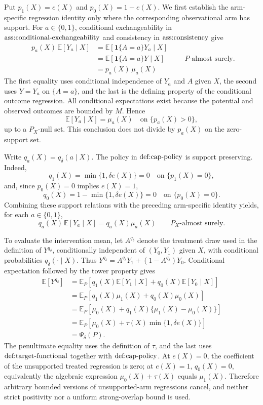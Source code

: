 Put \(p_1(X)=e(X)\) and \(p_0(X)=1-e(X)\).  We first establish the arm-specific regression identity only where the corresponding observational arm has support.  For \(a\in\{0,1\}\), conditional exchangeability in \(\textnormal{ass:conditional-exchangeability}\) and consistency in \(\textnormal{ass:consistency}\) give
\[
\begin{aligned}
 p_a(X)\,\mathbb E[Y_a\mid X]
 &=\mathbb E[\mathbf 1\{A=a\}Y_a\mid X] \\
 &=\mathbb E[\mathbf 1\{A=a\}Y\mid X] \\
 &=p_a(X)\,\mu_a(X)
\end{aligned}
\qquad P\text{-almost surely}.
\]
The first equality uses conditional independence of \(Y_a\) and \(A\) given \(X\), the second uses \(Y=Y_a\) on \(\{A=a\}\), and the last is the defining property of the conditional outcome regression.  All conditional expectations exist because the potential and observed outcomes are bounded by \(M\).  Hence
\[
\mathbb E[Y_a\mid X]=\mu_a(X)
\quad\text{on }\{p_a(X)>0\},
\]
up to a \(P_X\)-null set.  This conclusion does not divide by \(p_a(X)\) on the zero-support set.

Write \(q_a(X)=q_\delta(a\mid X)\).  The policy in \(\textnormal{def:cap-policy}\) is support preserving.  Indeed,
\[
q_1(X)=\min\{1,\delta e(X)\}=0\quad\text{on }\{p_1(X)=0\},
\]
and, since \(p_0(X)=0\) implies \(e(X)=1\),
\[
q_0(X)=1-\min\{1,\delta e(X)\}=0\quad\text{on }\{p_0(X)=0\}.
\]
Combining these support relations with the preceding arm-specific identity yields, for each \(a\in\{0,1\}\),
\[
q_a(X)\,\mathbb E[Y_a\mid X]=q_a(X)\mu_a(X)
\qquad P_X\text{-almost surely}.
\]

To evaluate the intervention mean, let \(A^{q_\delta}\) denote the treatment draw used in the definition of \(Y^{q_\delta}\), conditionally independent of \((Y_0,Y_1)\) given \(X\), with conditional probabilities \(q_\delta(\cdot\mid X)\).  Thus \(Y^{q_\delta}=A^{q_\delta}Y_1+(1-A^{q_\delta})Y_0\).  Conditional expectation followed by the tower property gives
\[
\begin{aligned}
\mathbb E[Y^{q_\delta}]
&=\mathbb E_P\!\left[q_1(X)\mathbb E[Y_1\mid X]+q_0(X)\mathbb E[Y_0\mid X]\right] \\
&=\mathbb E_P\!\left[q_1(X)\mu_1(X)+q_0(X)\mu_0(X)\right] \\
&=\mathbb E_P\!\left[\mu_0(X)+q_1(X)\{\mu_1(X)-\mu_0(X)\}\right] \\
&=\mathbb E_P\!\left[\mu_0(X)+\tau(X)\min\{1,\delta e(X)\}\right] \\
&=\Psi_\delta(P).
\end{aligned}
\]
The penultimate equality uses the definition of \(\tau\), and the last uses \(\textnormal{def:target-functional}\) together with \(\textnormal{def:cap-policy}\).  At \(e(X)=0\), the coefficient of the unsupported treated regression is zero; at \(e(X)=1\), \(q_0(X)=0\), equivalently the algebraic expression \(\mu_0(X)+\tau(X)\) equals \(\mu_1(X)\).  Therefore arbitrary bounded versions of unsupported-arm regressions cancel, and neither strict positivity nor a uniform strong-overlap bound is used.
